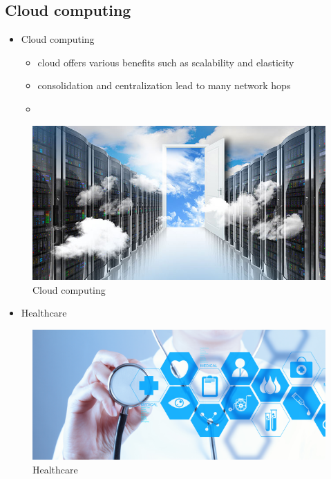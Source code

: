 \documentclass{beamer}
\begin{document}
\subsection{Cloud computing}
\begin{frame}
\begin{itemize}
	\item Cloud computing
	\begin{itemize}
		\item<1-> \color{blue} {cloud offers various benefits such as
			scalability and elasticity}
		\item<2-> {consolidation and centralization
			lead to many network hops}
		\item<3-> \color{red}{results in high latencies and high bandwidth consumption}
		
	\end{itemize}
\end{itemize}
\begin{figure}
	\includegraphics[scale=0.35]{cloud-computing-2}
	\caption{Cloud computing}
	\label{fig:cloud-computing-2}
\end{figure}
\end{frame}
\begin{frame}
\begin{itemize}
	\item Healthcare
\end{itemize}	
\begin{figure}
	\centering
	\includegraphics[width=0.7\linewidth]{healthcare}
	\caption{Healthcare}
	\label{fig:healthcare}
\end{figure}
\end{frame}
\end{document}
